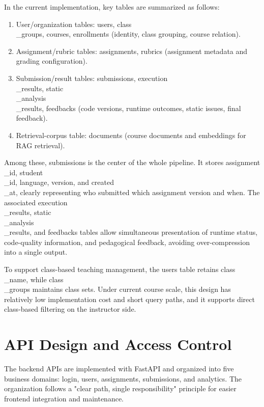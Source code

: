 In the current implementation, key tables are summarized as follows:

\begin{enumerate}
\item User/organization tables: users, class\\_groups, courses, enrollments (identity, class grouping, course relation).
\item Assignment/rubric tables: assignments, rubrics (assignment metadata and grading configuration).
\item Submission/result tables: submissions, execution\\_results, static\\_analysis\\_results, feedbacks (code versions, runtime outcomes, static issues, final feedback).
\item Retrieval-corpus table: documents (course documents and embeddings for RAG retrieval).
\end{enumerate}


Among these, submissions is the center of the whole pipeline. It stores assignment\\_id, student\\_id, language, version, and created\\_at, clearly representing who submitted which assignment version and when. The associated execution\\_results, static\\_analysis\\_results, and feedbacks tables allow simultaneous presentation of runtime status, code-quality information, and pedagogical feedback, avoiding over-compression into a single output.

To support class-based teaching management, the users table retains class\\_name, while class\\_groups maintains class sets. Under current course scale, this design has relatively low implementation cost and short query paths, and it supports direct class-based filtering on the instructor side.

\section{API Design and Access Control}

The backend APIs are implemented with FastAPI and organized into five business domains: login, users, assignments, submissions, and analytics. The organization follows a "clear path, single responsibility" principle for easier frontend integration and maintenance.

